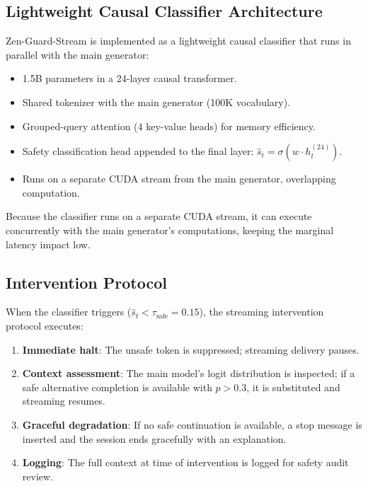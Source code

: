 \documentclass[11pt,a4paper]{article}
\begin{document}
\subsection{Lightweight Causal Classifier Architecture}

Zen-Guard-Stream is implemented as a lightweight causal classifier that runs in parallel with the main generator:

\begin{itemize}
  \item 1.5B parameters in a 24-layer causal transformer.
  \item Shared tokenizer with the main generator (100K vocabulary).
  \item Grouped-query attention (4 key-value heads) for memory efficiency.
  \item Safety classification head appended to the final layer: $\hat{s}_t = \sigma(w \cdot h_t^{(24)})$.
  \item Runs on a separate CUDA stream from the main generator, overlapping computation.
\end{itemize}

Because the classifier runs on a separate CUDA stream, it can execute concurrently with the main generator's computations, keeping the marginal latency impact low.

\subsection{Intervention Protocol}

When the classifier triggers ($\hat{s}_t < \tau_{\text{safe}} = 0.15$), the streaming intervention protocol executes:

\begin{enumerate}
  \item \textbf{Immediate halt}: The unsafe token is suppressed; streaming delivery pauses.
  \item \textbf{Context assessment}: The main model's logit distribution is inspected; if a safe alternative completion is available with $p > 0.3$, it is substituted and streaming resumes.
  \item \textbf{Graceful degradation}: If no safe continuation is available, a stop message is inserted and the session ends gracefully with an explanation.
  \item \textbf{Logging}: The full context at time of intervention is logged for safety audit review.
\end{enumerate}
\end{document}
